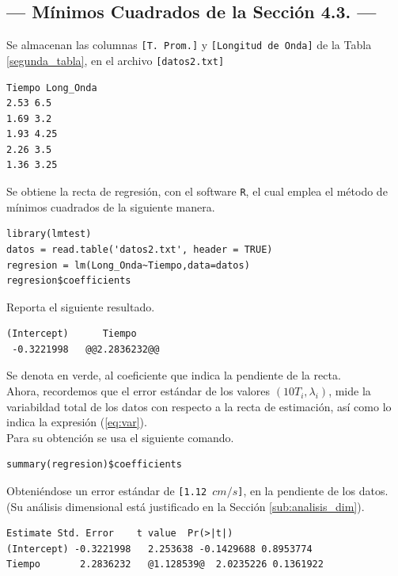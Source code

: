 \documentclass[12pt,a4paper]{article}
\begin{document}
\subsection{--- Mínimos Cuadrados de la Sección 4.3. ---} %
\label{minimos_cuadrados_4_3}
Se almacenan las columnas \texttt{[T. Prom.]} y \texttt{[Longitud de Onda]} de la Tabla \ref{segunda_tabla}, en el archivo \texttt{[datos2.txt]}
\begin{lstlisting}[backgroundcolor = \color{gray!13}]
Tiempo Long_Onda
2.53 6.5
1.69 3.2
1.93 4.25
2.26 3.5
1.36 3.25
	\end{lstlisting}
	Se obtiene la recta de regresión, con el software \texttt{R}, el cual emplea el método de mínimos cuadrados de la siguiente manera.
	\begin{lstlisting}
library(lmtest)
datos = read.table('datos2.txt', header = TRUE) 
regresion = lm(Long_Onda~Tiempo,data=datos)
regresion$coefficients
	\end{lstlisting}
Reporta el siguiente resultado.
\begin{lstlisting}[backgroundcolor = \color{gray!13}]
(Intercept)      Tiempo 
 -0.3221998   @@2.2836232@@
\end{lstlisting}
Se denota en verde, al coeficiente que indica la pendiente de la recta. \\[2mm]
Ahora, recordemos que el error estándar de los valores \((10T_i,\lambda _i)\), mide la variabildad total de los datos con respecto a la recta de estimación, así como lo indica la expresión (\ref{eq:var}). \\[2mm]
Para su obtención se usa el siguiente comando.
\begin{lstlisting}
summary(regresion)$coefficients
\end{lstlisting}
Obteniéndose un error estándar de \texttt{[1.12 \(cm/s\)]}, en la pendiente de los datos. (Su análisis dimensional está justificado en la Sección \ref{sub:analisis_dim}).
\begin{lstlisting}[backgroundcolor = \color{gray!13}]
              Estimate Std. Error    t value  Pr(>|t|)
(Intercept) -0.3221998   2.253638 -0.1429688 0.8953774
Tiempo       2.2836232   @1.128539@  2.0235226 0.1361922
\end{lstlisting}

\end{document}
